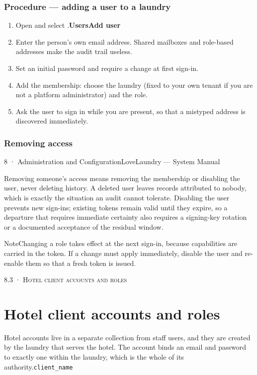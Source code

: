\documentclass[11pt,a4paper,oneside]{book}
\begin{document}
\subsubsection*{Procedure — adding a user to a laundry}
\begin{enumerate}
\item Open  and select .\textbf{Users}\textbf{Add user}
\item Enter the person's own email address. Shared mailboxes and role-based addresses make the audit trail useless.
\item Set an initial password and require a change at first sign-in.
\item Add the membership: choose the laundry (fixed to your own tenant if you are not a platform administrator) and the role.
\item Ask the user to sign in while you are present, so that a mistyped address is discovered immediately.
\end{enumerate}
\subsubsection*{Removing access}
8 · Administration and ConfigurationLoveLaundry — System Manual

Removing someone's access means removing the membership or disabling the user, never deleting history. A deleted user leaves records attributed to nobody, which is exactly the situation an audit cannot tolerate. Disabling the user prevents new sign-ins; existing tokens remain valid until they expire, so a departure that requires immediate certainty also requires a signing-key rotation or a documented acceptance of the residual window.

\begin{notebox}NoteChanging a role takes effect at the next sign-in, because capabilities are carried in the token. If a change must apply immediately, disable the user and re-enable them so that a fresh token is issued.\end{notebox}
\textsc{\small\color{crimson}8.3 · Hotel client accounts and roles}\par\medskip
\section*{Hotel client accounts and roles}
Hotel accounts live in a separate collection from staff users, and they are created by the laundry that serves the hotel. The account binds an email and password to exactly one  within the laundry, which is the whole of its authority.\texttt{client\_name}
\end{document}
